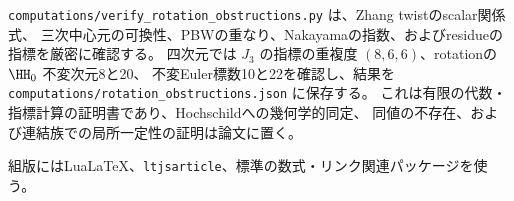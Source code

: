 \texttt{computations/verify\_rotation\_obstructions.py} は、Zhang twistのscalar関係式、
三次中心元の可換性、PBWの重なり、Nakayamaの指数、およびresidueの指標を厳密に確認する。
四次元では \(J_3\) の指標の重複度 \((8,6,6)\)、rotationの \(\HH_0\) 不変次元8と20、
不変Euler標数10と22を確認し、結果を
\texttt{computations/rotation\_obstructions.json} に保存する。
これは有限の代数・指標計算の証明書であり、Hochschildへの幾何学的同定、
同値の不存在、および連結族での局所一定性の証明は論文に置く。

組版にはLuaLaTeX、\texttt{ltjsarticle}、標準の数式・リンク関連パッケージを使う。

\begingroup
\small

\endgroup

